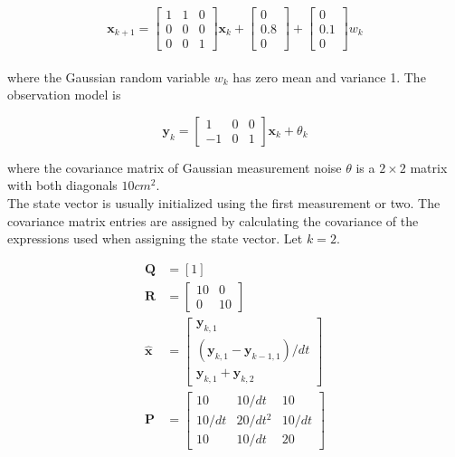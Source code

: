 \documentclass[10pt,conference,compsoc]{IEEEtran}
\newcommand{\mtx}[1] {\bm #1}
\begin{document}
\begin{equation}
  \mtx{x}_{k+1} = \left[
  \begin{array}{ccc}
    1 & 1 & 0 \\
    0 & 0 & 0 \\
    0 & 0 & 1
  \end{array} \right] \mtx{x}_k + \left[
  \begin{array}{c}
    0 \\
    0.8 \\
    0
  \end{array} \right] + \left[
  \begin{array}{c}
    0 \\
    0.1 \\
    0
  \end{array} \right] w_k
\end{equation}
\\
\noindent where the Gaussian random variable $w_k$ has zero mean and variance 1.
The observation model is

\begin{equation}
  \mtx{y}_k = \left[
  \begin{array}{ccc}
    1 & 0 & 0 \\
    -1 & 0 & 1
  \end{array} \right] \mtx{x}_k + \theta_k
\end{equation}

\noindent where the covariance matrix of Gaussian measurement noise $\theta$ is
a $2 \times 2$ matrix with both diagonals $10 cm^2$. \\

\noindent The state vector is usually initialized using the first measurement
or two. The covariance matrix entries are assigned by calculating the covariance
of the expressions used when assigning the state vector. Let $k = 2$.

\begin{align}
  \mtx{Q} &= \left[1\right] \\
  \mtx{R} &= \left[
  \begin{array}{cc}
    10 & 0 \\
    0 & 10
  \end{array} \right] \\
  \hat{\mtx{x}} &= \left[
  \begin{array}{c}
    \mtx{y}_{k,1} \\
    (\mtx{y}_{k,1} - \mtx{y}_{k-1,1})/dt \\
    \mtx{y}_{k,1} + \mtx{y}_{k,2}
  \end{array} \right] \\
  \mtx{P} &= \left[
  \begin{array}{ccc}
    10 & 10/dt & 10 \\
    10/dt & 20/dt^2 & 10/dt \\
    10 & 10/dt & 20
  \end{array} \right]
\end{align}
\end{document}
